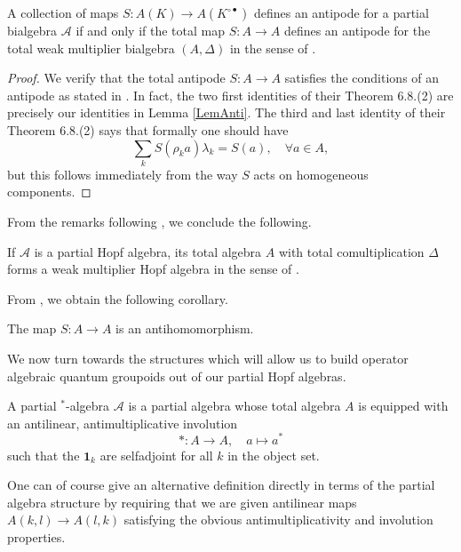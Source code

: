 \begin{Prop} A collection of maps $S:A(K)\rightarrow A(K^{\circ\bullet})$ defines an antipode for a partial bialgebra $\mathscr{A}$ if and only if the total map $S:A\rightarrow A$ defines an antipode for the total weak multiplier bialgebra $(A,\Delta)$ in the sense of \cite[Section 6]{Boh1}. 
\end{Prop} 

\begin{proof} We verify that the total antipode $S:A\rightarrow A$ satisfies the conditions of an antipode as stated in \cite[Theorem 6.8.(2)]{Boh1}. In fact, the two first identities of their Theorem 6.8.(2) are precisely our identities in Lemma \ref{LemAnti}. The third and last identity of their Theorem 6.8.(2) says that formally one should have \[\sum_kS(\rho_k a)\lambda_k = S(a),\quad \forall a\in A,\] but this follows immediately from the way $S$ acts on homogeneous components.%
\end{proof}

From the remarks following \cite[Theorem 6.8.(2)]{Boh1}, we conclude the following.

\begin{Cor} If $\mathscr{A}$ is a partial Hopf algebra, its total algebra $A$ with total comultiplication $\Delta$ forms a weak multiplier Hopf algebra in the sense of \cite[Definition 1.14]{VDW1}.
\end{Cor}

 From \cite[Theorem 6.12]{Boh1}, we obtain the following corollary. 

\begin{Cor} The map $S:A\rightarrow A$ is an antihomomorphism.
\end{Cor} 

We now turn towards the structures which will allow us to build operator algebraic quantum groupoids out of our partial Hopf algebras.

\begin{Def} A partial $^*$-algebra $\mathscr{A}$ is a partial algebra whose total algebra $A$ is equipped with an antilinear, antimultiplicative involution \[*:A\rightarrow A,\quad a\mapsto a^*\] such that the $\mathbf{1}_k$ are selfadjoint for all $k$ in the object set. 
\end{Def} 

One can of course give an alternative definition directly in terms of the partial algebra structure by requiring that we are given antilinear maps $A(k,l)\rightarrow A(l,k)$ satisfying the obvious antimultiplicativity and involution properties.


